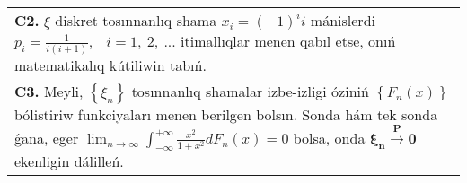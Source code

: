 \documentclass{article}
\begin{document}
\begin{tabular}{m{17cm}}
 \\
\textbf{C2.} 
\(\xi\) diskret tosınnanlıq shama \(x_{i} = ( - 1)^{i}i\) mánislerdi \(p_{i} = \frac{1}{i(i + 1)},\) \(\ \ i = 1,\ 2,\ ...\) itimallıqlar menen qabıl etse, onıń matematikalıq kútiliwin tabıń.
 \\
\textbf{C3.} Meyli, \(\left\{ \xi_{n} \right\}\) tosınnanlıq shamalar izbe-izligi óziniń \(\left\{ F_{n}(x) \right\}\) bólistiriw funkciyaları menen berilgen bolsın. Sonda hám tek sonda ǵana, eger \(\lim_{n \rightarrow \infty}\int_{- \infty}^{+ \infty}{\frac{x^{2}}{1 + x^{2}}dF_{n}(x)} = 0\) bolsa, onda \(\mathbf{\xi}_{\mathbf{n}}\overset{\mathbf{P}}{\rightarrow}\mathbf{0}\) ekenligin dálilleń.
 \\

\end{tabular}
\vspace{1cm}
\end{document}
